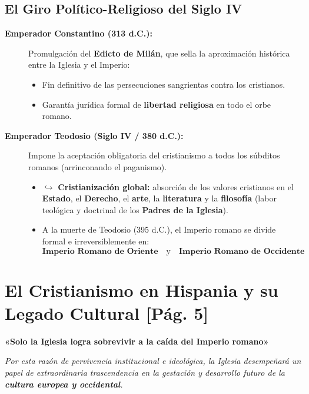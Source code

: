 \documentclass[11pt,letterpaper]{article}
\begin{document}
\subsection{El Giro Político-Religioso del Siglo IV}
\begin{description}
  \item[\textbf{Emperador Constantino (313 d.C.):}]
  Promulgación del \textbf{Edicto de Milán}, que sella la aproximación histórica entre la Iglesia y el Imperio:
  \begin{itemize}
    \item Fin definitivo de las persecuciones sangrientas contra los cristianos.
    \item Garantía jurídica formal de \textbf{libertad religiosa} en todo el orbe romano.
  \end{itemize}

  \item[\textbf{Emperador Teodosio (Siglo IV / 380 d.C.):}]
  Impone la aceptación obligatoria del cristianismo a todos los súbditos romanos (arrinconando el paganismo).
  \begin{itemize}
    \item $\hookrightarrow$ \textbf{Cristianización global:} absorción de los valores cristianos en el \textbf{Estado}, el \textbf{Derecho}, el \textbf{arte}, la \textbf{literatura} y la \textbf{filosofía} (labor teológica y doctrinal de los \textbf{Padres de la Iglesia}).
    \item A la muerte de Teodosio (395 d.C.), el Imperio romano se divide formal e irreversiblemente en:
    \[
      \textbf{Imperio Romano de Oriente} \quad\text{y}\quad \textbf{Imperio Romano de Occidente}
    \]
  \end{itemize}
\end{description}

\bigskip

\newpage
\section{El Cristianismo en Hispania y su Legado Cultural \hfill\normalfont\small\color{gray}[Pág. 5]}

\begin{headerbox}
  \begin{center}
    \Large\bfseries\color{romaRed!90!black}
    «Solo la Iglesia logra sobrevivir a la caída del Imperio romano»
  \end{center}
  \vskip 2pt
  \centering\small\itshape
  Por esta razón de pervivencia institucional e ideológica, la Iglesia desempeñará un papel de extraordinaria trascendencia en la gestación y desarrollo futuro de la \textbf{cultura europea y occidental}.
\end{headerbox}
\end{document}
